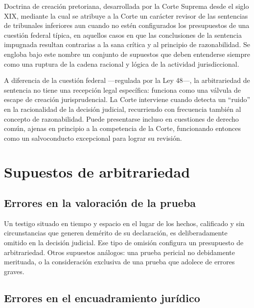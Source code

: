 \documentclass[12pt,oneside]{book}
\begin{document}
\begin{defbox}
Doctrina de creación pretoriana, desarrollada por la Corte Suprema desde el siglo
XIX, mediante la cual se atribuye a la Corte un carácter revisor de las sentencias
de tribunales inferiores aun cuando no estén configurados los presupuestos de una
cuestión federal típica, en aquellos casos en que las conclusiones de la sentencia
impugnada resultan contrarias a la sana crítica y al principio de razonabilidad.
Se engloba bajo este nombre un conjunto de supuestos que deben entenderse siempre
como una ruptura de la cadena racional y lógica de la actividad jurisdiccional.
\end{defbox}

A diferencia de la cuestión federal —regulada por la Ley 48—, la arbitrariedad de
sentencia no tiene una recepción legal específica: funciona como una válvula de
escape de creación jurisprudencial. La Corte interviene cuando detecta un
``ruido'' en la racionalidad de la decisión judicial, recurriendo con frecuencia
también al concepto de razonabilidad. Puede presentarse incluso en cuestiones de
derecho común, ajenas en principio a la competencia de la Corte, funcionando
entonces como un salvoconducto excepcional para lograr su revisión.

\section{Supuestos de arbitrariedad}

\subsection{Errores en la valoración de la prueba}

\begin{exbox}
Un testigo situado en tiempo y espacio en el lugar de los hechos, calificado y sin
circunstancias que generen demérito de su declaración, es deliberadamente omitido
en la decisión judicial. Ese tipo de omisión configura un presupuesto de
arbitrariedad. Otros supuestos análogos: una prueba pericial no debidamente
merituada, o la consideración exclusiva de una prueba que adolece de errores
graves.
\end{exbox}

\subsection{Errores en el encuadramiento jurídico}
\end{document}

